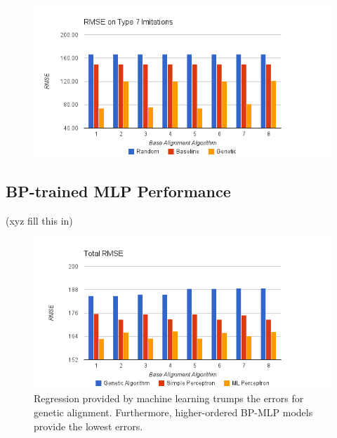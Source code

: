 \begin{figure}[center]
	\centering
	\includegraphics[width=16cm]{images/chart5.png}
	\caption{}
	\label{fig:c7}
\end{figure}


\clearpage

\subsection{BP-trained MLP Performance}
(xyz fill this in)

\begin{figure}[center]
	\centering
	\includegraphics[width=16cm]{images/chart4.png}
	\caption{Regression provided by machine learning trumps the errors for genetic alignment. Furthermore, higher-ordered BP-MLP models provide the lowest errors.}
	\label{fig:overall_ml}
\end{figure}

